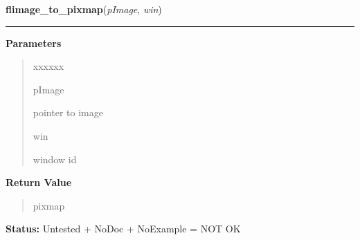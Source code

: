 \hspace{.8\funcindent}\begin{boxedminipage}{\funcwidth}

    \raggedright \textbf{flimage\_to\_pixmap}(\textit{pImage}, \textit{win})

    \vspace{-1.5ex}

    \rule{\textwidth}{0.5\fboxrule}
\setlength{\parskip}{2ex}
\setlength{\parskip}{1ex}
      \textbf{Parameters}
      \vspace{-1ex}

      \begin{quote}
        \begin{Ventry}{xxxxxx}

          \item[pImage]

          pointer to image

          \item[win]

          window id

        \end{Ventry}

      \end{quote}

      \textbf{Return Value}
    \vspace{-1ex}

      \begin{quote}
      pixmap

      \end{quote}

\textbf{Status:} Untested + NoDoc + NoExample = NOT OK



    \end{boxedminipage}

    \label{xformslib:library:flimage_dup}

    \vspace{0.5ex}

